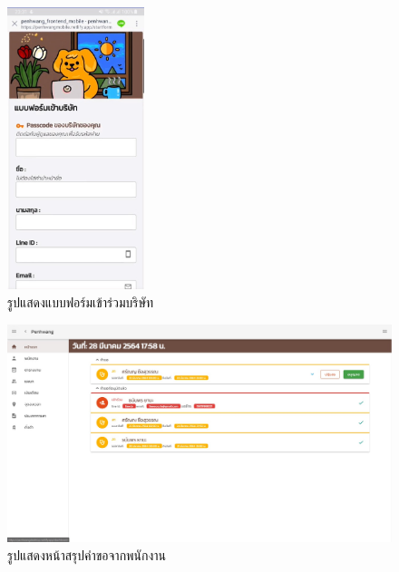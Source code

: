 \begin{figure}
  \begin{center}
    \includegraphics[width=4cm,keepaspectratio]{./images/line_start_form.jpg}
  \end{center}
  \caption[รูปแสดงแบบฟอร์มเข้าร่วมบริษัท]{รูปแสดงแบบฟอร์มเข้าร่วมบริษัท} 
  \label{fig:line_start_form}
\end{figure}

\begin{figure}
  \begin{center}
    \includegraphics[width=14cm,keepaspectratio]{./images/dashboard.jpg}
  \end{center}
  \caption[รูปแสดงหน้าสรุปคำขอจากพนักงาน]{รูปแสดงหน้าสรุปคำขอจากพนักงาน} 
  \label{fig:dashboard}
\end{figure}

